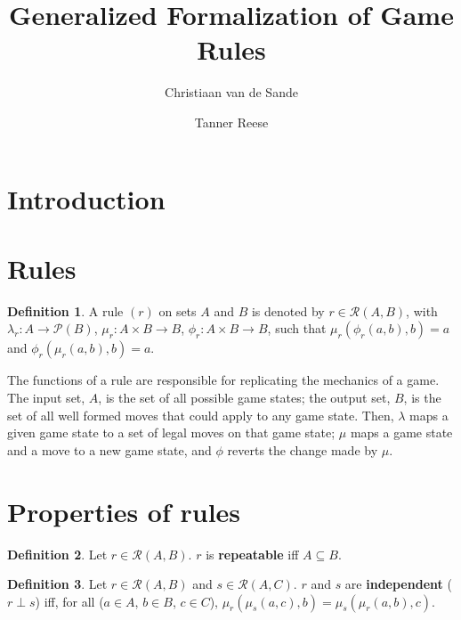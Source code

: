 \documentclass{article}
\title{Generalized Formalization of Game Rules}
\author{Christiaan van de Sande \and Tanner Reese}
\theoremstyle{definition}
\newtheorem{definition}{Definition}[section]
\theoremstyle{plain}
\def\rule{\mathcal{R}}
\begin{document}
\maketitle

\section{Introduction}

\section{Rules}

\begin{definition}
  A rule $ (r) $ on sets $ A $ and $ B $ is denoted by $ r \in \rule (A, B) $,
  with $ \lambda_r : A          \rightarrow \mathcal{P} (B) $,
       $     \mu_r : A \times B \rightarrow B $,
       $    \phi_r : A \times B \rightarrow B $, 
  such that $ \mu_r (\phi_r (a, b), b) = a $
  and $ \phi_r (\mu_r (a, b), b) = a $.
\end{definition}

The functions of a rule are responsible for replicating the mechanics of a game.
The input set, $A$, is the set of all possible game states; the output set, $B$, is the set of all well formed moves that could apply to any game state.
Then, $\lambda$ maps a given game state to a set of legal moves on that game state;
$\mu$ maps a game state and a move to a new game state,
and $\phi$ reverts the change made by $\mu$.

\section{Properties of rules}

\begin{definition}
  Let $ r \in \rule (A, B) $. $ r $ is \textbf{repeatable} iff $ A \subseteq B $.
\end{definition}

\begin{definition}
  Let $ r \in \rule (A, B) $
  and $ s \in \rule (A, C) $.
  $r$ and $s$ are \textbf{independent} ($ r \perp s $) iff,
  for all ($ a \in A $, $ b \in B $, $ c \in C $),
  $ \mu_r (\mu_s (a, c), b) = \mu_s (\mu_r (a, b), c) $. 
\end{definition}
\end{document}
